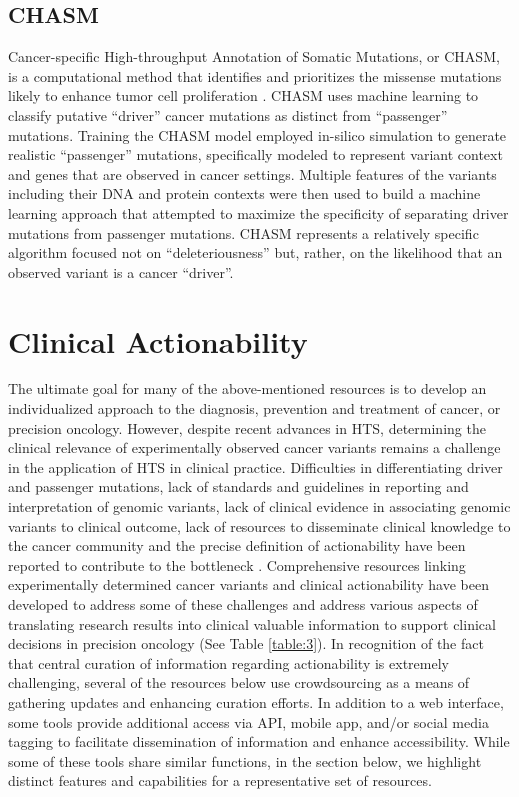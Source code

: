 \documentclass{article}
\begin{document}
\subsection{CHASM}

Cancer-specific High-throughput Annotation of Somatic Mutations, or
CHASM, is a computational method that identifies and prioritizes the
missense mutations likely to enhance tumor cell proliferation
\parencite{Carter2009-ci}. CHASM uses machine learning to classify putative
``driver'' cancer mutations as distinct from ``passenger''
mutations. Training the CHASM model employed in-silico simulation to
generate realistic ``passenger'' mutations, specifically modeled to
represent variant context and genes that are observed in cancer
settings. Multiple features of the variants including their DNA and protein
contexts were then used to build a machine learning approach that
attempted to maximize the specificity of separating driver mutations
from passenger mutations. CHASM represents a relatively specific
algorithm focused not on ``deleteriousness'' but, rather, on the
likelihood that an observed variant is a cancer ``driver''.


\section{Clinical Actionability}



The ultimate goal for many of the above-mentioned resources is to
develop an individualized approach to the diagnosis, prevention and
treatment of cancer, or precision oncology. However, despite recent
advances in HTS, determining the clinical relevance of experimentally
observed cancer variants remains a challenge in the application of HTS
in clinical practice. Difficulties in differentiating driver and
passenger mutations, lack of standards and guidelines in reporting and
interpretation of genomic variants, lack of clinical evidence in
associating genomic variants to clinical outcome, lack of resources to
disseminate clinical knowledge to the cancer community and the precise
definition of actionability have been reported to contribute to the
bottleneck
\parencite{Li2017-aw,Prawira2017-gv,Uzilov2016-ct,Hedley_Carr2016-ul}. Comprehensive
resources linking experimentally determined cancer variants and
clinical actionability have been developed to address some of these
challenges and address various aspects of translating research results
into clinical valuable information to support clinical decisions in
precision oncology (See Table \ref{table:3}). In recognition of the fact that
central curation of information regarding actionability is extremely
challenging, several of the resources below use crowdsourcing as a
means of gathering updates and enhancing curation efforts. In addition
to a web interface, some tools provide additional access via API,
mobile app, and/or social media tagging to facilitate dissemination of
information and enhance accessibility. While some of these tools share
similar functions, in the section below, we highlight distinct
features and capabilities for a representative set of resources.
\end{document}
